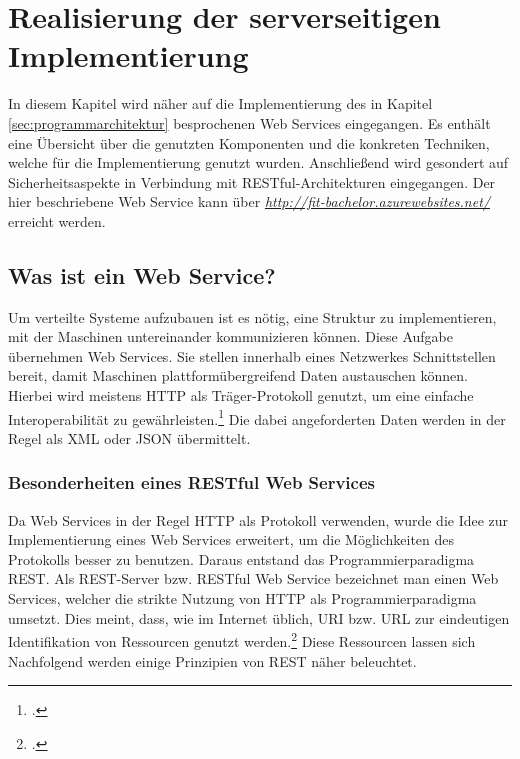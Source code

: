 \chapter{Realisierung der serverseitigen Implementierung}
\label{cha:server-impl}
In diesem Kapitel wird näher auf die Implementierung des in Kapitel \ref{sec:programmarchitektur} besprochenen Web Services eingegangen. Es enthält eine Übersicht über die genutzten Komponenten und die konkreten Techniken, welche für die Implementierung genutzt wurden. Anschließend wird gesondert auf Sicherheitsaspekte in Verbindung mit \ac{REST}ful-Architekturen eingegangen. Der hier beschriebene Web Service kann über  \textit{\href{http://fit-bachelor.azurewebsites.net/}{http://fit-bachelor.azurewebsites.net/}} erreicht werden. 
\section{Was ist ein Web Service?}
\label{sec:definition-webservice}
Um verteilte Systeme aufzubauen ist es nötig, eine Struktur zu implementieren, mit der Maschinen untereinander kommunizieren können. Diese Aufgabe übernehmen Web Services. Sie stellen innerhalb eines Netzwerkes Schnittstellen bereit, damit Maschinen plattformübergreifend Daten austauschen können. Hierbei wird meistens \ac{HTTP} als Träger-Protokoll genutzt, um eine einfache Interoperabilität zu gewährleisten.\footcite{Definition-Webservice} Die dabei angeforderten Daten werden in der Regel als \ac{XML} oder \ac{JSON} übermittelt. 
\subsection{Besonderheiten eines RESTful Web Services}
\label{sec:definition-rest}
Da Web Services in der Regel \ac{HTTP} als Protokoll verwenden, wurde die Idee zur Implementierung eines Web Services erweitert, um die Möglichkeiten des Protokolls besser zu benutzen. Daraus entstand das Programmierparadigma \ac{REST}. Als \ac{REST}-Server bzw. \ac{REST}ful Web Service bezeichnet man einen Web Services, welcher die strikte Nutzung von \ac{HTTP} als Programmierparadigma umsetzt.  Dies meint, dass, wie im Internet üblich, \ac{URI} bzw. \ac{URL} zur eindeutigen Identifikation von Ressourcen genutzt werden.\footcite[S. 26ff.]{REST-und-HTTP} Diese Ressourcen lassen sich Nachfolgend werden einige Prinzipien von \ac{REST} näher beleuchtet.

